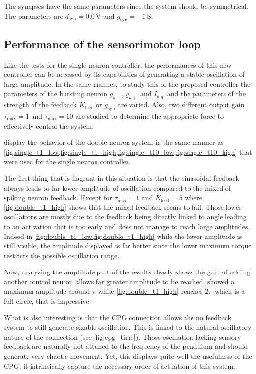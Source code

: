 The synapses have the same parameters since the system should be symmetrical. The parameters are $d_\text{syn} = \qty{0.0}{\volt}$ and $g_\text{syn} = \qty{-1}{\siemens}$.

\subsection{Performance of the sensorimotor loop}

Like the tests for the single neuron controller, the performances of this new controller can be accessed by its capabilities of generating a stable oscillation of large amplitude. 
In the same manner, to study this of the proposed controller the parameters of the bursting neuron $g_{s-}$, $g_{u+}$ and $I_\text{app}$ and the parameters of the strength of the feedback $K_\text{feed}$ or $g_\text{syn}$ are varied. 
Also, two different output gain $\tau_\text{max} = 1$ and $\tau_\text{max} = 10$ are studied to determine the appropriate force to effectively control the system.  %

 display the behavior of the double neuron system in the same manner as \cref{fig:single_t1_low,fig:single_t1_high,fig:single_t10_low,fig:single_t10_high} that were used for the single neuron controller.

The first thing that is flagrant in this situation is that the sinusoidal feedback always leads to far lower amplitude of oscillation compared to the mixed of spiking neuron feedback. 
Except for $\tau_\text{max}=1$ and $K_\text{feed} = 5$ where \cref{fig:double_t1_high} shows that the mixed feedback seems to fail. 
Those lower oscillations are  mostly due to the feedback being directly linked to angle leading to an activation that is too early and does not manage to reach large amplitudes. 
Indeed in \cref{fig:double_t1_low,fig:double_t1_high} while the lower amplitude is still visible, the amplitude displayed is far better since the lower maximum torque restricts the possible oscillation range.

Now, analyzing the amplitude part of the results clearly shows the gain of adding another control neuron allows far greater amplitude to be reached. 
 showed a maximum amplitude around $\pi$ while \cref{fig:double_t1_high} reaches $2\pi$ which is a full circle, that is impressive. 

What is also interesting is that the CPG connection allows the no feedback system to still generate sizable oscillation. 
This is linked to the natural oscillatory nature of the connection (see \cref{fig:cpg_time}).
Those oscillation lacking sensory feedback are naturally not attuned to the frequency of the pendulum and should generate very chaotic movement. 
Yet, this displays quite well the usefulness of the CPG, it intrinsically capture the necessary order of actuation of this system.


